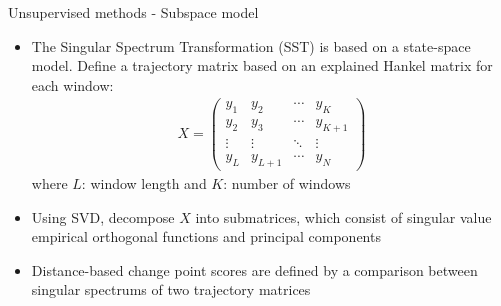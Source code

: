 \documentclass{beamer}
\begin{document}
\begin{frame}{Unsupervised methods - Subspace model}
    \begin{itemize}
        \item The Singular Spectrum Transformation (SST) is based on a state-space model. Define a trajectory matrix based on an explained Hankel matrix for each window:
        \begin{align*}
        X=
        \begin{pmatrix}
        y_1    & y_2     & \cdots & y_K     \\
        y_2    & y_3     & \cdots & y_{K+1} \\
        \vdots & \vdots  & \ddots & \vdots  \\
        y_L    & y_{L+1} & \cdots & y_N
        \end{pmatrix}
        \end{align*}
        where $L$: window length and $K$: number of windows
        
        \item Using SVD, decompose $X$ into submatrices, which consist of singular value empirical orthogonal functions and principal components
        
        \item Distance-based change point scores are defined by a comparison between singular spectrums of two trajectory matrices
    \end{itemize}
\end{frame}
\end{document}
